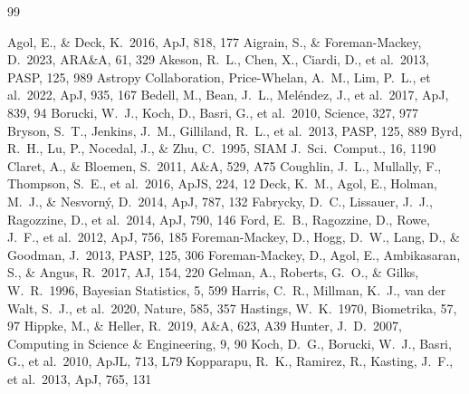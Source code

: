 \documentclass[11pt]{article}
\begin{document}

\begin{thebibliography}{99}

 Agol, E., \& Deck, K.\ 2016, ApJ, 818, 177
 Aigrain, S., \& Foreman-Mackey, D.\ 2023, ARA\&A, 61, 329
 Akeson, R.~L., Chen, X., Ciardi, D., et al.\ 2013, PASP, 125, 989
 Astropy Collaboration, Price-Whelan, A.~M., Lim, P.~L., et al.\ 2022, ApJ, 935, 167
 Bedell, M., Bean, J.~L., Mel\'endez, J., et al.\ 2017, ApJ, 839, 94
 Borucki, W.~J., Koch, D., Basri, G., et al.\ 2010, Science, 327, 977
 Bryson, S.~T., Jenkins, J.~M., Gilliland, R.~L., et al.\ 2013, PASP, 125, 889
 Byrd, R.~H., Lu, P., Nocedal, J., \& Zhu, C.\ 1995, SIAM J.\ Sci.\ Comput., 16, 1190
 Claret, A., \& Bloemen, S.\ 2011, A\&A, 529, A75
 Coughlin, J.~L., Mullally, F., Thompson, S.~E., et al.\ 2016, ApJS, 224, 12
 Deck, K.~M., Agol, E., Holman, M.~J., \& Nesvorn\'y, D.\ 2014, ApJ, 787, 132
 Fabrycky, D.~C., Lissauer, J.~J., Ragozzine, D., et al.\ 2014, ApJ, 790, 146
 Ford, E.~B., Ragozzine, D., Rowe, J.~F., et al.\ 2012, ApJ, 756, 185
 Foreman-Mackey, D., Hogg, D.~W., Lang, D., \& Goodman, J.\ 2013, PASP, 125, 306
 Foreman-Mackey, D., Agol, E., Ambikasaran, S., \& Angus, R.\ 2017, AJ, 154, 220
 Gelman, A., Roberts, G.~O., \& Gilks, W.~R.\ 1996, Bayesian Statistics, 5, 599
 Harris, C.~R., Millman, K.~J., van der Walt, S.~J., et al.\ 2020, Nature, 585, 357
 Hastings, W.~K.\ 1970, Biometrika, 57, 97
 Hippke, M., \& Heller, R.\ 2019, A\&A, 623, A39
 Hunter, J.~D.\ 2007, Computing in Science \& Engineering, 9, 90
 Koch, D.~G., Borucki, W.~J., Basri, G., et al.\ 2010, ApJL, 713, L79
 Kopparapu, R.~K., Ramirez, R., Kasting, J.~F., et al.\ 2013, ApJ, 765, 131

\end{thebibliography}
\end{document}
